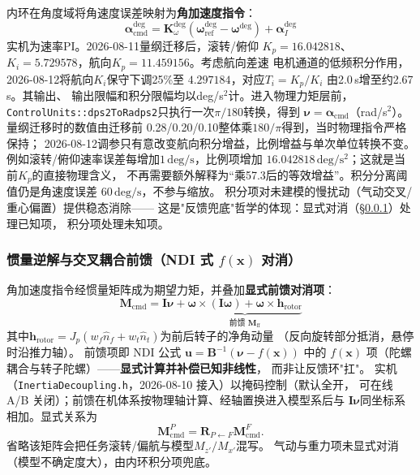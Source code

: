 内环在角度域将角速度误差映射为\textbf{角加速度指令}：
\begin{equation}
    \boldsymbol{\alpha}_{\mathrm{cmd}}^{\deg}
    = \mathbf{K}_\omega^{\deg}\left(\boldsymbol{\omega}_{\mathrm{ref}}^{\deg}
                        - \boldsymbol{\omega}^{\deg}\right)+\boldsymbol\alpha_I^{\deg}
    \label{eq:cascade_nu_ch}
\end{equation}
实机为速率PI。2026-08-11量纲迁移后，滚转/俯仰
$K_p=16.042818$、$K_i=5.729578$，航向$K_p=11.459156$。考虑航向差速
电机通道的低频积分作用，2026-08-12将航向$K_i$保守下调25\%至
$4.297184$，对应$T_i=K_p/K_i$ 由2.0\,s增至约2.67\,s。其输出、
输出限幅和积分限幅均以deg/s$^2$计。进入物理力矩层前，
\texttt{ControlUnits::dps2ToRadps2}只执行一次$\pi/180$转换，得到
$\boldsymbol\nu=\boldsymbol\alpha_{\mathrm{cmd}}$（rad/s$^2$）。量纲迁移时的数值由迁移前
0.28/0.20/0.10整体乘$180/\pi$得到，当时物理指令严格保持；
2026-08-12调参只有意改变航向积分增益，比例增益与单次单位转换不变。
例如滚转/俯仰速率误差每增加$1\,\mathrm{deg/s}$，比例项增加
$16.042818\,\mathrm{deg/s^2}$；这就是当前$K_p$的直接物理含义，
不再需要额外解释为“乘57.3后的等效增益”。积分分离阈值仍是角速度误差
$60\,\mathrm{deg/s}$，不参与缩放。
积分项对未建模的慢扰动（气动交叉/重心偏置）提供稳态消除——
这是"反馈兜底"哲学的体现：显式对消（§\ref{sec:cascade_ff}）处理已知项，
积分项处理未知项。

\subsubsection{惯量逆解与交叉耦合前馈（NDI 式 $f(\mathbf{x})$ 对消）}
\label{sec:cascade_ff}

角加速度指令经惯量矩阵成为期望力矩，并叠加\textbf{显式前馈对消项}：
\begin{equation}
    \boxed{
    \mathbf{M}_{\mathrm{cmd}} = \mathbf{I}\boldsymbol{\nu}
    + \underbrace{\boldsymbol{\omega}\times(\mathbf{I}\boldsymbol{\omega})
      + \boldsymbol{\omega}\times\mathbf{h}_{\mathrm{rotor}}}_{\text{前馈 }
      \mathbf{M}_{\mathrm{ff}}}
    }
    \label{eq:cascade_ff}
\end{equation}
其中$\mathbf{h}_{\mathrm{rotor}}=J_p(w_f\hat{n}_f + w_t\hat{n}_t)$为前后转子的净角动量
（反向旋转部分抵消，悬停时沿推力轴）。
前馈项即 NDI 公式 $\mathbf{u}=\mathbf{B}^{-1}(\boldsymbol{\nu}-f(\mathbf{x}))$
中的 $f(\mathbf{x})$ 项（陀螺耦合与转子陀螺）——\textbf{显式计算并补偿已知非线性}，
而非让反馈环"扛"。
实机（\texttt{InertiaDecoupling.h}，2026-08-10 接入）以掩码控制（默认全开，
可在线 A/B 关闭）；前馈在机体系按物理轴计算、经轴置换进入模型系后与
$\mathbf{I}\boldsymbol{\nu}$同坐标系相加。显式关系为
\begin{equation}
\mathbf M_{\mathrm{cmd}}^P
=\mathbf R_{P\leftarrow F}\mathbf M_{\mathrm{cmd}}^F .
\label{eq:cascade_axis_permutation}
\end{equation}
省略该矩阵会把任务滚转/偏航与模型$M_{z'}/M_{x'}$混写。
气动与重力项未显式对消（模型不确定度大），由内环积分项兜底。

